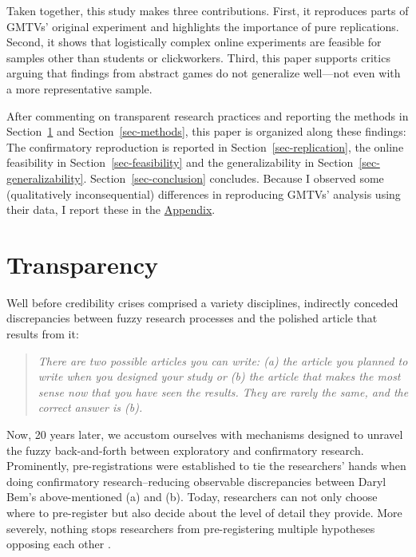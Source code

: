\documentclass[
  authoryear,
  review,
  3p,
  onecolumn]{elsarticle}
\begin{document}
Taken together, this study makes three contributions. First, it
reproduces parts of GMTVs' original experiment and highlights the
importance of pure replications. Second, it shows that logistically
complex online experiments are feasible for samples other than students
or clickworkers. Third, this paper supports critics arguing that
findings from abstract games do not generalize well---not even with a
more representative sample.

After commenting on transparent research practices and reporting the
methods in Section~\ref{sec-transparency} and Section~\ref{sec-methods},
this paper is organized along these findings: The confirmatory
reproduction is reported in Section~\ref{sec-replication}, the online
feasibility in Section~\ref{sec-feasibility} and the generalizability in
Section~\ref{sec-generalizability}. Section~\ref{sec-conclusion}
concludes. Because I observed some (qualitatively inconsequential)
differences in reproducing GMTVs' analysis using their data, I report
these in the \href{@sec-appendix}{Appendix}.

\hypertarget{sec-transparency}{%
\section{Transparency}\label{sec-transparency}}

Well before credibility crises comprised a variety disciplines,
\citet[p.~2]{bemwriting} indirectly conceded discrepancies between fuzzy
research processes and the polished article that results from it:

\begin{quote}
\emph{There are two possible articles you can write: (a) the article you
planned to write when you designed your study or (b) the article that
makes the most sense now that you have seen the results. They are rarely
the same, and the correct answer is (b).}
\end{quote}

Now, 20 years later, we accustom ourselves with mechanisms designed to
unravel the fuzzy back-and-forth between exploratory and confirmatory
research. Prominently, pre-registrations were established to tie the
researchers' hands when doing confirmatory research--reducing observable
discrepancies between Daryl Bem's above-mentioned (a) and (b). Today,
researchers can not only choose where to pre-register but also decide
about the level of detail they provide. More severely, nothing stops
researchers from pre-registering multiple hypotheses opposing each other
\citetext{\citealp[see, e.g.,][]{SimmonsEtAl2021}; \citealp[and][ for a
discussion]{PhamEtAl2021}}.
\end{document}

